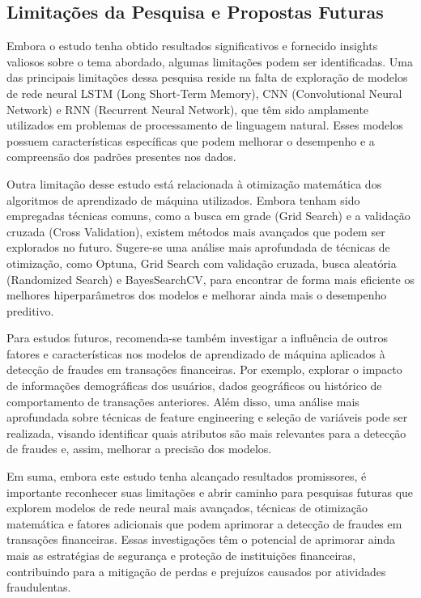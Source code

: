 \subsection{Limita\c c\~oes da Pesquisa e Propostas Futuras}



Embora o estudo tenha obtido resultados significativos e fornecido insights valiosos sobre o tema abordado, algumas limitações podem ser identificadas. Uma das principais limitações dessa pesquisa reside na falta de exploração de modelos de rede neural LSTM (Long Short-Term Memory), CNN (Convolutional Neural Network) e RNN (Recurrent Neural Network), que têm sido amplamente utilizados em problemas de processamento de linguagem natural. Esses modelos possuem características específicas que podem melhorar o desempenho e a compreensão dos padrões presentes nos dados.

Outra limitação desse estudo está relacionada à otimização matemática dos algoritmos de aprendizado de máquina utilizados. Embora tenham sido empregadas técnicas comuns, como a busca em grade (Grid Search) e a validação cruzada (Cross Validation), existem métodos mais avançados que podem ser explorados no futuro. Sugere-se uma análise mais aprofundada de técnicas de otimização, como Optuna, Grid Search com validação cruzada, busca aleatória (Randomized Search) e BayesSearchCV, para encontrar de forma mais eficiente os melhores hiperparâmetros dos modelos e melhorar ainda mais o desempenho preditivo.

Para estudos futuros, recomenda-se também investigar a influência de outros fatores e características nos modelos de aprendizado de máquina aplicados à detecção de fraudes em transações financeiras. Por exemplo, explorar o impacto de informações demográficas dos usuários, dados geográficos ou histórico de comportamento de transações anteriores. Além disso, uma análise mais aprofundada sobre técnicas de feature engineering e seleção de variáveis pode ser realizada, visando identificar quais atributos são mais relevantes para a detecção de fraudes e, assim, melhorar a precisão dos modelos.

Em suma, embora este estudo tenha alcançado resultados promissores, é importante reconhecer suas limitações e abrir caminho para pesquisas futuras que explorem modelos de rede neural mais avançados, técnicas de otimização matemática e fatores adicionais que podem aprimorar a detecção de fraudes em transações financeiras. Essas investigações têm o potencial de aprimorar ainda mais as estratégias de segurança e proteção de instituições financeiras, contribuindo para a mitigação de perdas e prejuízos causados por atividades fraudulentas.
